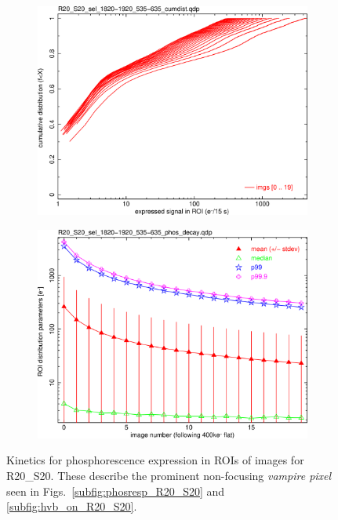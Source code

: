 \begin{figure}[!htbp]
\begin{subfigure}{0.45\textwidth}    
  \centering
  \includegraphics[width=\textwidth]{figures/phosphorescence-survey/phos_kinetics/R20_S20_sel_1820-1920_535-635_cumdist.png}    
\end{subfigure}
\hfil
\begin{subfigure}{0.45\textwidth}
  \centering
  \includegraphics[width=\textwidth]{figures/phosphorescence-survey/phos_kinetics/R20_S20_sel_1820-1920_535-635_phos_decay.png}
\end{subfigure}
\newline
\caption{Kinetics for phosphorescence expression in ROIs of images for R20\_S20. These describe the prominent non-focusing {\it vampire pixel} seen in Figs.~\ref{subfig:phosresp_R20_S20} and \ref{subfig:hvb_on_R20_S20}.}
\label{fig:phos:kinetics:R20S20}
\end{figure}

